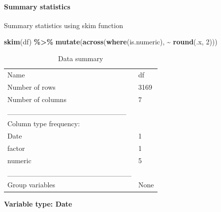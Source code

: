 \documentclass[
]{article}
\newenvironment{Shaded}{\begin{snugshade}}{\end{snugshade}}
\newcommand{\DecValTok}[1]{\textcolor[rgb]{0.00,0.00,0.81}{#1}}
\newcommand{\FunctionTok}[1]{\textcolor[rgb]{0.13,0.29,0.53}{\textbf{#1}}}
\newcommand{\NormalTok}[1]{#1}
\newcommand{\SpecialCharTok}[1]{\textcolor[rgb]{0.81,0.36,0.00}{\textbf{#1}}}
\begin{document}
\paragraph{Summary statistics}\label{summary-statistics}

Summary statistics using skim function

\begin{Shaded}
\begin{Highlighting}[]
\FunctionTok{skim}\NormalTok{(df) }\SpecialCharTok{\%\textgreater{}\%} 
  \FunctionTok{mutate}\NormalTok{(}\FunctionTok{across}\NormalTok{(}\FunctionTok{where}\NormalTok{(is.numeric), }\SpecialCharTok{\textasciitilde{}} \FunctionTok{round}\NormalTok{(.x, }\DecValTok{2}\NormalTok{)))}
\end{Highlighting}
\end{Shaded}

\begin{longtable}[]{@{}ll@{}}
\caption{Data summary}\tabularnewline
\toprule\noalign{}
\endfirsthead
\endhead
\bottomrule\noalign{}
\endlastfoot
Name & df \\
Number of rows & 3169 \\
Number of columns & 7 \\
\_\_\_\_\_\_\_\_\_\_\_\_\_\_\_\_\_\_\_\_\_\_\_ & \\
Column type frequency: & \\
Date & 1 \\
factor & 1 \\
numeric & 5 \\
\_\_\_\_\_\_\_\_\_\_\_\_\_\_\_\_\_\_\_\_\_\_\_\_ & \\
Group variables & None \\
\end{longtable}

\textbf{Variable type: Date}
\end{document}
